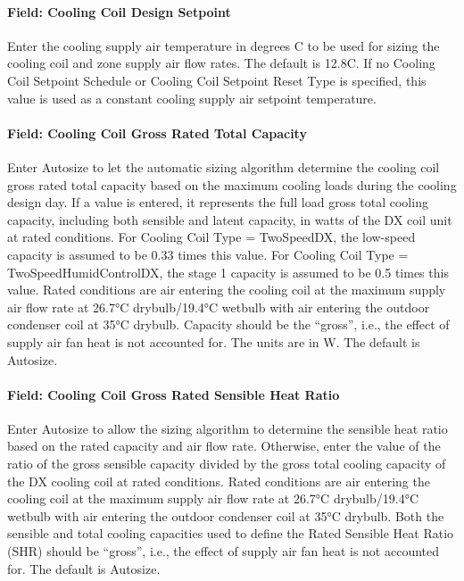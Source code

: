 \paragraph{Field: Cooling Coil Design Setpoint}\label{field-cooling-coil-design-setpoint-2}

Enter the cooling supply air temperature in degrees C to be used for sizing the cooling coil and zone supply air flow rates. The default is 12.8C. If no Cooling Coil Setpoint Schedule or Cooling Coil Setpoint Reset Type is specified, this value is used as a constant cooling supply air setpoint temperature.

\paragraph{Field: Cooling Coil Gross Rated Total Capacity}\label{field-cooling-coil-gross-rated-total-capacity-6}

Enter Autosize to let the automatic sizing algorithm determine the cooling coil gross rated total capacity based on the maximum cooling loads during the cooling design day. If a value is entered, it represents the full load gross total cooling capacity, including both sensible and latent capacity, in watts of the DX coil unit at rated conditions. For Cooling Coil Type = TwoSpeedDX, the low-speed capacity is assumed to be 0.33 times this value. For Cooling Coil Type = TwoSpeedHumidControlDX, the stage 1 capacity is assumed to be 0.5 times this value. Rated conditions are air entering the cooling coil at the maximum supply air flow rate at 26.7°C drybulb/19.4°C wetbulb with air entering the outdoor condenser coil at 35°C drybulb. Capacity should be the ``gross'', i.e., the effect of supply air fan heat is not accounted for. The units are in W. The default is Autosize.

\paragraph{Field: Cooling Coil Gross Rated Sensible Heat Ratio}\label{field-cooling-coil-gross-rated-sensible-heat-ratio-6}

Enter Autosize to allow the sizing algorithm to determine the sensible heat ratio based on the rated capacity and air flow rate. Otherwise, enter the value of the ratio of the gross sensible capacity divided by the gross total cooling capacity of the DX cooling coil at rated conditions. Rated conditions are air entering the cooling coil at the maximum supply air flow rate at 26.7°C drybulb/19.4°C wetbulb with air entering the outdoor condenser coil at 35°C drybulb. Both the sensible and total cooling capacities used to define the Rated Sensible Heat Ratio (SHR) should be ``gross'', i.e., the effect of supply air fan heat is not accounted for. The default is Autosize.

